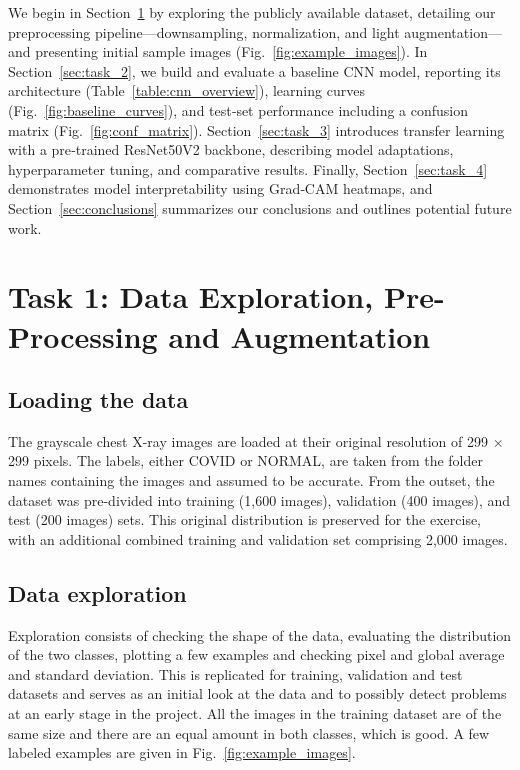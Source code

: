 \documentclass[conference]{IEEEtran}
\begin{document}
We begin in Section~\ref{sec:task_1} by exploring the publicly available dataset, detailing our preprocessing pipeline—downsampling, normalization, and light augmentation—and presenting initial sample images (Fig.~\ref{fig:example_images}). In Section~\ref{sec:task_2}, we build and evaluate a baseline CNN model, reporting its architecture (Table~\ref{table:cnn_overview}), learning curves (Fig.~\ref{fig:baseline_curves}), and test‑set performance including a confusion matrix (Fig.~\ref{fig:conf_matrix}). Section~\ref{sec:task_3} introduces transfer learning with a pre‑trained ResNet50V2 backbone, describing model adaptations, hyperparameter tuning, and comparative results. Finally, Section~\ref{sec:task_4} demonstrates model interpretability using Grad‑CAM heatmaps, and Section~\ref{sec:conclusions} summarizes our conclusions and outlines potential future work.

\section{Task 1: Data Exploration, Pre-Processing and Augmentation}\label{sec:task_1}

\subsection{Loading the data}
The grayscale chest X-ray images are loaded at their original resolution of 299 × 299 pixels. The labels, either COVID or NORMAL, are taken from the folder names containing the images and assumed to be accurate. From the outset, the dataset was pre-divided into training (1,600 images), validation (400 images), and test (200 images) sets. This original distribution is preserved for the exercise, with an additional combined training and validation set comprising 2,000 images.

\subsection{Data exploration}
Exploration consists of checking the shape of the data, evaluating the distribution of the two classes, plotting a few examples and checking pixel and global average and standard deviation. This is replicated for training, validation and test datasets and serves as an initial look at the data and to possibly detect problems at an early stage in the project.
All the images in the training dataset are of the same size and there are an equal amount in both classes, which is good. A few labeled examples are given in Fig.~\ref{fig:example_images}.
\end{document}
